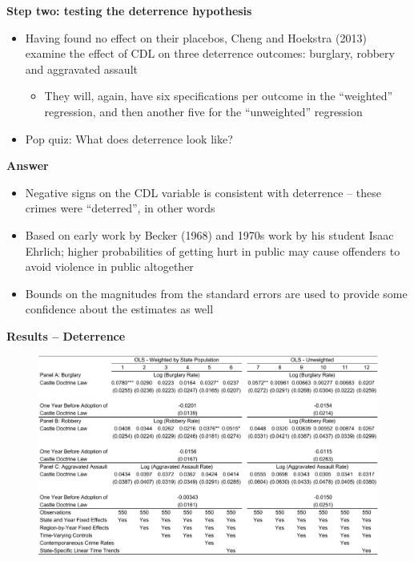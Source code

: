 \documentclass[notes=show]{beamer}
\begin{document}
\begin{frame}[plain]
	\begin{center}
	\textbf{Step two: testing the deterrence hypothesis}
	\end{center}
	
	\begin{itemize}
	\item Having found no effect on their placebos, Cheng and Hoekstra (2013) examine the effect of CDL on three deterrence outcomes: burglary, robbery and aggravated assault
		\begin{itemize}
		\item They will, again, have six specifications per outcome in the ``weighted'' regression, and then another five for the ``unweighted'' regression
		\end{itemize}
	\item Pop quiz: What does deterrence look like?
	\end{itemize}
\end{frame}

\begin{frame}[plain]
\begin{center}
\textbf{Answer}
\end{center}

		\begin{itemize}
		\item Negative signs on the CDL variable is consistent with deterrence -- these crimes were ``deterred'', in other words
		\item Based on early work by Becker (1968) and 1970s work by his student Isaac Ehrlich; higher probabilities of getting hurt in public may cause offenders to avoid violence in public altogether
		\item Bounds on the magnitudes from the standard errors are used to provide some confidence about the estimates as well
		\end{itemize}

\end{frame}

\begin{frame}[plain]
	\begin{center}
	\textbf{Results -- Deterrence}
	\end{center}
	
	\begin{figure}
	\includegraphics[scale=0.4]{./lecture_includes/cheng4.pdf}
	\end{figure}
\end{frame}
\end{document}
